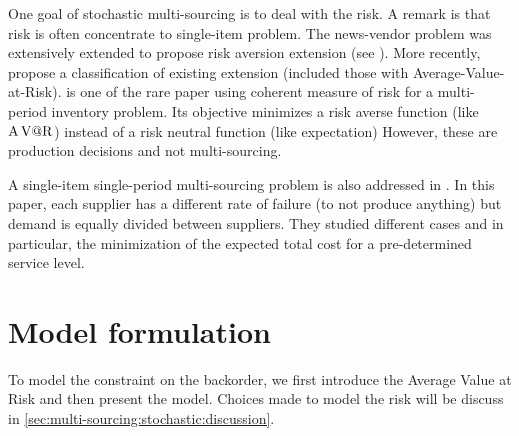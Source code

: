 One goal of stochastic multi-sourcing is to deal with the risk.
A remark is that risk is often concentrate to single-item problem.
The news-vendor problem was extensively extended to propose risk aversion extension (see \citet{Vipul2000,Choi2008}).
More recently, \citet{Arikan2017} propose a classification of existing extension (included those with Average-Value-at-Risk).
\citet{Ahmed2007} is one of the rare paper using coherent measure of risk for a multi-period inventory problem.
Its objective minimizes a risk averse function (like $\operatorname{A\operatorname{V@R}}$) instead of a risk neutral function (like expectation)
However, these are production decisions and not multi-sourcing.


A single-item single-period multi-sourcing problem is also addressed in \citet{Meena2011}.
In this paper, each supplier has a different rate of failure (\ie to not produce anything) but demand is equally divided between suppliers.
They studied different cases and in particular, the minimization of the expected total cost for a pre-determined service level.














\section{Model formulation}
\label{sec:multi-sourcing:stochastic:model-formulation}


To model the constraint on the backorder, we first introduce the Average Value at Risk and then present the model.
Choices made to model the risk will be discuss in \cref{sec:multi-sourcing:stochastic:discussion}.


